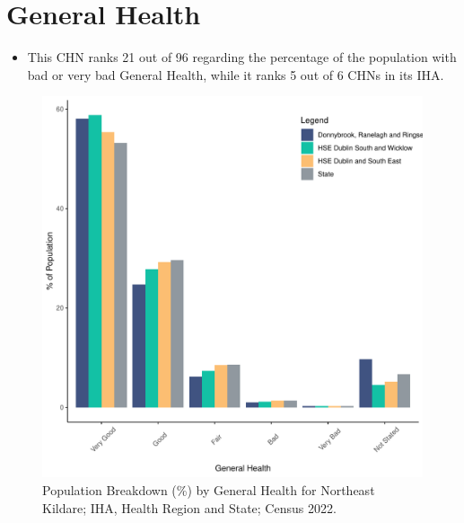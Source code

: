 \documentclass{article}
\begin{document}
\pagebreak

\section{General Health}\label{sect:GenHealth}
\begin{itemize}
\item  This CHN ranks  21 out of 96 regarding the percentage of the population with bad or very bad General Health, while it ranks   5 out of 6 CHNs in its IHA.
\end{itemize}
\begin{figure}[h]
	\centering
	\includegraphics[width = 150mm]{../figures/GenED.pdf}
	\caption{Population Breakdown (\%) by General Health for Northeast Kildare; IHA, Health Region and State;  Census 2022.}
	\label{fig:2ae19629-1a6a-13a3-e055-000000000001}
	\end{figure}
\end{document}
